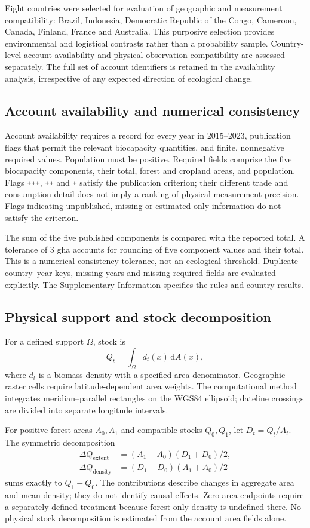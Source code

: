 \documentclass[11pt,a4paper]{article}
\begin{document}
Eight countries were selected for evaluation of geographic and measurement compatibility: Brazil, Indonesia, Democratic Republic of the Congo, Cameroon, Canada, Finland, France and Australia. This purposive selection provides environmental and logistical contrasts rather than a probability sample. Country-level account availability and physical observation compatibility are assessed separately. The full set of account identifiers is retained in the availability analysis, irrespective of any expected direction of ecological change.

\subsection{Account availability and numerical consistency}
Account availability requires a record for every year in 2015--2023, publication flags that permit the relevant biocapacity quantities, and finite, nonnegative required values. Population must be positive. Required fields comprise the five biocapacity components, their total, forest and cropland areas, and population. Flags \texttt{+++}, \texttt{++} and \texttt{+} satisfy the publication criterion; their different trade and consumption detail does not imply a ranking of physical measurement precision. Flags indicating unpublished, missing or estimated-only information do not satisfy the criterion.

The sum of the five published components is compared with the reported total. A tolerance of 3 gha accounts for rounding of five component values and their total. This is a numerical-consistency tolerance, not an ecological threshold. Duplicate country--year keys, missing years and missing required fields are evaluated explicitly. The Supplementary Information specifies the rules and country results.

\subsection{Physical support and stock decomposition}
For a defined support $\Omega$, stock is
\[
Q_t=\int_{\Omega} d_t(x)\,\mathrm dA(x),
\]
where $d_t$ is a biomass density with a specified area denominator. Geographic raster cells require latitude-dependent area weights. The computational method integrates meridian--parallel rectangles on the WGS84 ellipsoid; dateline crossings are divided into separate longitude intervals.

For positive forest areas $A_0,A_1$ and compatible stocks $Q_0,Q_1$, let $D_t=Q_t/A_t$. The symmetric decomposition
\begin{align}
\Delta Q_{\mathrm{extent}}&=(A_1-A_0)(D_1+D_0)/2,\label{eq:extent}\\
\Delta Q_{\mathrm{density}}&=(D_1-D_0)(A_1+A_0)/2\label{eq:density}
\end{align}
sums exactly to $Q_1-Q_0$. The contributions describe changes in aggregate area and mean density; they do not identify causal effects. Zero-area endpoints require a separately defined treatment because forest-only density is undefined there. No physical stock decomposition is estimated from the account area fields alone.
\end{document}
